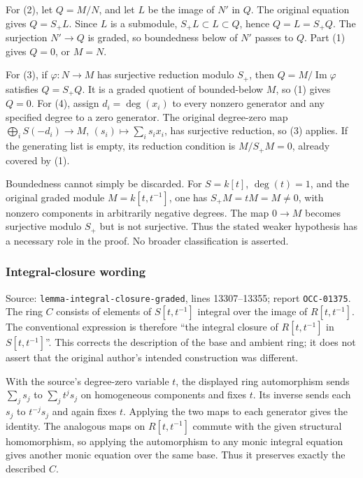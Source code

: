 For (2), let \(Q=M/N\), and let \(L\) be the image of \(N'\) in \(Q\). The original equation gives \(Q=S_+L\). Since \(L\) is a submodule, \(S_+L\subset L\subset Q\), hence \(Q=L=S_+Q\). The surjection \(N'\to Q\) is graded, so boundedness below of \(N'\) passes to \(Q\). Part (1) gives \(Q=0\), or \(M=N\).

For (3), if \(\varphi:N\to M\) has surjective reduction modulo \(S_+\), then \(Q=M/\operatorname{Im}\varphi\) satisfies \(Q=S_+Q\). It is a graded quotient of bounded-below \(M\), so (1) gives \(Q=0\). For (4), assign \(d_i=\deg(x_i)\) to every nonzero generator and any specified degree to a zero generator. The original degree-zero map \(\bigoplus_i S(-d_i)\to M\), \((s_i)\mapsto\sum_i s_i x_i\), has surjective reduction, so (3) applies. If the generating list is empty, its reduction condition is \(M/S_+M=0\), already covered by (1).

Boundedness cannot simply be discarded. For \(S=k[t]\), \(\deg(t)=1\), and the original graded module \(M=k[t,t^{-1}]\), one has \(S_+M=tM=M\ne0\), with nonzero components in arbitrarily negative degrees. The map \(0\to M\) becomes surjective modulo \(S_+\) but is not surjective. Thus the stated weaker hypothesis has a necessary role in the proof. No broader classification is asserted.

\subsubsection{Integral-closure wording}\label{algebra-proof-002-integral-closure-wording}

Source: \texttt{lemma-\AlgebraIdentifierBreak{}integral-\AlgebraIdentifierBreak{}closure-\AlgebraIdentifierBreak{}graded}, lines 13307--13355; report \texttt{OCC-01375}. The ring \(C\) consists of elements of \(S[t,t^{-1}]\) integral over the image of \(R[t,t^{-1}]\). The conventional expression is therefore ``the integral closure of \(R[t,t^{-1}]\) in \(S[t,t^{-1}]\)''. This corrects the description of the base and ambient ring; it does not assert that the original author's intended construction was different.

With the source's degree-zero variable \(t\), the displayed ring automorphism sends \(\sum_j s_j\) to \(\sum_j t^j s_j\) on homogeneous components and fixes \(t\). Its inverse sends each \(s_j\) to \(t^{-j}s_j\) and again fixes \(t\). Applying the two maps to each generator gives the identity. The analogous maps on \(R[t,t^{-1}]\) commute with the given structural homomorphism, so applying the automorphism to any monic integral equation gives another monic equation over the same base. Thus it preserves exactly the described \(C\).


